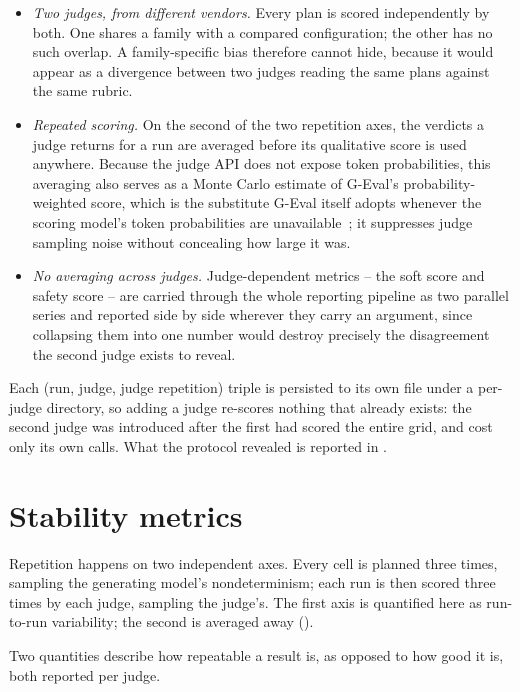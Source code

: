 \begin{itemize}
    \item \emph{Two judges, from different vendors.} Every plan is scored independently by both. One shares a family with a compared configuration; the other has no such overlap. A family-specific bias therefore cannot hide, because it would appear as a divergence between two judges reading the same plans against the same rubric.
    \item \emph{Repeated scoring.} On the second of the two repetition axes, the verdicts a judge returns for a run are averaged before its qualitative score is used anywhere. Because the judge API does not expose token probabilities, this averaging also serves as a Monte Carlo estimate of G-Eval's probability-weighted score, which is the substitute G-Eval itself adopts whenever the scoring model's token probabilities are unavailable~\cite{liu2023geval}; it suppresses judge sampling noise without concealing how large it was.
    \item \emph{No averaging across judges.} Judge-dependent metrics -- the soft score and safety score -- are carried through the whole reporting pipeline as two parallel series and reported side by side wherever they carry an argument, since collapsing them into one number would destroy precisely the disagreement the second judge exists to reveal.
\end{itemize}

Each (run, judge, judge repetition) triple is persisted to its own file under a per-judge directory, so adding a judge re-scores nothing that already exists: the second judge was introduced after the first had scored the entire grid, and cost only its own calls. What the protocol revealed is reported in .

\section{Stability metrics}
\label{sec:methodology-stability}

Repetition happens on two independent axes. Every cell is planned three times, sampling the generating model's nondeterminism; each run is then scored three times by each judge, sampling the judge's. The first axis is quantified here as run-to-run variability; the second is averaged away ().

Two quantities describe how repeatable a result is, as opposed to how good it is, both reported per judge.

